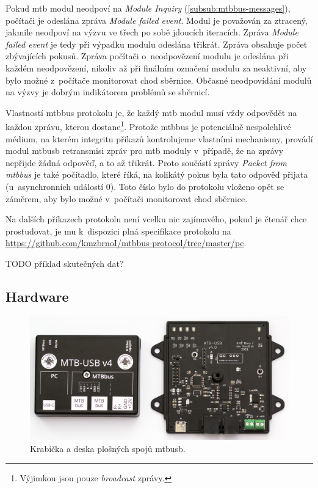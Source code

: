 Pokud \gls{mtb} modul neodpoví na \textit{Module Inquiry}
(\ref{subsub:mtbbus-messages}), počítači je odeslána zpráva \textit{Module
failed event}. Modul je považován za ztracený, jakmile neodpoví na výzvu
ve třech po sobě jdoucích iteracích. Zpráva \textit{Module failed event}
je tedy při výpadku modulu odeslána třikrát. Zpráva obsahuje počet zbývajících
pokusů. Zpráva počítači o~neodpovězení modulu je odeslána při každém neodpovězení,
nikoliv až při finálním označení modulu za neaktivní, aby bylo možné z~počítače
monitorovat chod sběrnice. Občasné neodpovídání modulů na výzvy je dobrým
indikátorem problémů se sběrnicí.

Vlastností \gls{mtbbus} protokolu je, že každý \gls{mtb} modul musí vždy
odpovědět na každou zprávu, kterou dostane\footnote{Výjimkou jsou pouze
\textit{broadcast} zprávy.}. Protože \gls{mtbbus} je potenciálně nespolehlivé
médium, na kterém integritu příkazů kontrolujeme vlastními mechanismy, provádí
modul \gls{mtbusb} retransmisi zpráv pro \gls{mtb} moduly v~případě, že na zprávy
nepřijde žádná odpověď, a to až třikrát. Proto součástí zprávy \textit{Packet
from \gls{mtbbus}} je také počítadlo, které říká, na kolikátý pokus byla tato
odpověď přijata (u~asynchronních událostí 0). Toto číslo bylo do protokolu
vloženo opět se záměrem, aby bylo možné v~počítači monitorovat chod sběrnice.

Na dalších příkazech protokolu není vcelku nic zajímavého, pokud je čtenář chce
prostudovat, je mu k~dispozici plná specifikace protokolu na
\url{https://github.com/kmzbrnoI/mtbbus-protocol/tree/master/pc}.

TODO příklad skutečných dat?

\subsection{Hardware}

\begin{figure}[ht]
\includegraphics[width=\textwidth]{data/usb-inside.jpg}
\caption{Krabička a deska plošných spojů \gls{mtbusb}.}
\label{fig:mtbusb-prototype}
\end{figure}

